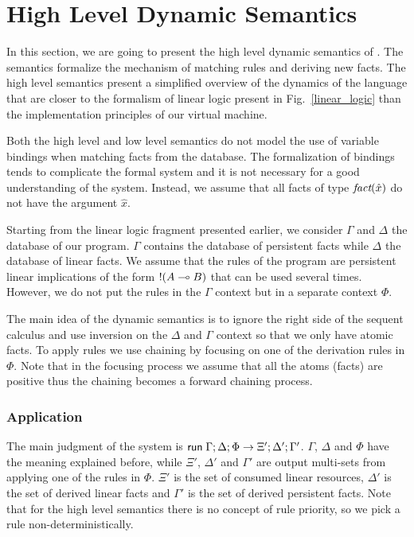 \section{High Level Dynamic Semantics}

In this section, we are going to present the high level dynamic semantics of \lang. The semantics
formalize the mechanism of matching rules and deriving new facts. The high level semantics
present a simplified overview of the dynamics of the language that are closer to the formalism
of linear logic present in Fig.~\ref{linear_logic} than the implementation principles of our
virtual machine.

Both the high level and low level semantics do not model the use of variable bindings when matching
facts from the database. The formalization of bindings tends to complicate the formal system and it is not
necessary for a good understanding of the system. Instead, we assume that all facts of
type $\emph{fact}(\hat{x})$ do not have the argument $\hat{x}$.

Starting from the linear logic fragment presented earlier, we consider $\Gamma$ and $\Delta$ the database
of our program. $\Gamma$ contains the database of persistent facts while $\Delta$ the database of linear
facts. We assume that the rules of the program are persistent linear implications of the form
${!} (A \multimap B)$ that can be used several times. However, we do not put the rules in the $\Gamma$
context but in a separate context $\Phi$.

The main idea of the dynamic semantics is to ignore the right side of the sequent calculus
and use inversion on the $\Delta$ and $\Gamma$ context so that we only have atomic facts.
To apply rules we use chaining by focusing on one of the derivation rules in $\Phi$. Note
that in the focusing process we assume that all the atoms (facts) are positive thus the chaining
becomes a forward chaining process.

\subsubsection{Application}

The main judgment of the system is $\mathsf{run} \; \Gamma; \Delta; \Phi \rightarrow \Xi'; \Delta'; \Gamma'$.
$\Gamma$, $\Delta$ and $\Phi$ have the meaning explained before, while $\Xi'$, $\Delta'$ and $\Gamma'$
are output multi-sets from applying one of the rules in $\Phi$. $\Xi'$ is the set of consumed linear
resources, $\Delta'$ is the set of derived linear facts and $\Gamma'$ is the set of derived persistent
facts. Note that for the high level semantics there is no concept of rule priority, so we pick a rule
non-deterministically.

